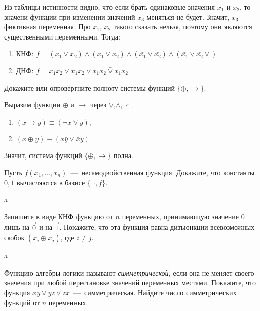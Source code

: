 \begin{solution}
\begin{enumerate}
\end{enumerate}
Из таблицы истинности видно, что если брать одинаковые значения  $x_1$ и $x_2$, то значени функции при изменении значений $x_3$ меняться не будет. Значит, $x_3$ - фиктивная переменная. Про $x_1$, $x_2$ такого сказать нельзя, поэтому они являются существенными  переменными. Тогда:
\begin{enumerate}
\item КНФ: $f=(x_1\vee x_2)\wedge(x_1\vee x_2)\wedge(\bar{x_1}\vee \bar{x_2})\wedge(\bar{x_1}\vee \bar{x_2}\vee)$
\item ДНФ: $f=\bar{x_1}x_2\vee \bar{x_1}x_2\vee x_1\bar{x_2}\bar\vee x_1\bar{x_2}$
\end{enumerate}


\end{solution}

\begin{exercise}
Докажите или опровергните полноту системы функций $\{\oplus,\to\}$.
\end{exercise}

\begin{solution}
Выразим функции $\oplus$ и $\to$ через $\vee$,$\wedge$,$\neg$:
\begin{enumerate}
\item $(x\to y)\equiv(\neg x\vee y)$,
\item $(x\oplus y)\equiv(x\bar{y}\vee \bar{x}y)$
\end{enumerate}
Значит, система функций $\{\oplus,\to\}$ полна.
\end{solution}

\begin{exercise}
Пусть $f(x_1,\ldots,x_n)$~---~несамодвойственная функция. Докажите, что
	константы $0, 1$ вычисляются в базисе $\{\neg, f\}$.
\end{exercise}

\begin{solution}
a
\end{solution}

\begin{exercise}
Запишите в виде КНФ функцию от $n$ переменных, принимающую значение
	$0$ лишь на $\vec{0}$ и на $\vec{1}$. Покажите, что эта функция равна
	дизъюнкции всевозможных скобок $(x_i\oplus x_j)$, где $i\neq j$. 
\end{exercise}

\begin{solution}
a
\end{solution}

\begin{exercise}
Функцию алгебры логики называют \textit{симметрической,} если она не 
	меняет своего значения при любой перестановке значений переменных местами.
	Покажите, что функция $\overline{xy}\vee\overline{yz}\vee\overline{zx}$~---~симметрическая.
	Найдите число симметрических функций от $n$ переменных.
\end{exercise}

